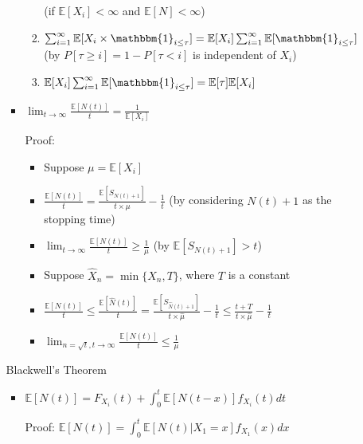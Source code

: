\documentclass[a4paper]{article}
\begin{document}
\begin{itemize}
\begin{itemize}
\begin{itemize}
\begin{enumerate}
                               (if $\mathbb{E}[X_i] < \infty$ and $\mathbb{E}[N] < \infty$)
                            \item $\sum_{i=1}^\infty \mathbb{E}[X_i \times \mathbbm{1}_{i\leq \tau}] = \mathbb{E}[X_i] \sum_{i=1}^\infty \mathbb{E}[\mathbbm{1}_{i\leq \tau}]$ (by $P[\tau \geq i] = 1 - P[\tau < i]$ is independent of $X_i$)
                            \item $\mathbb{E}[X_i] \sum_{i=1}^\infty \mathbb{E}[\mathbbm{1}_{i\leq \tau}] = \mathbb{E}[\tau] \mathbb{E}[X_i]$
                        \end{enumerate}
                    \item $\lim_{t \rightarrow \infty} \frac{\mathbb{E}[N(t)]}{t} = \frac{1}{\mathbb{E}[X_i]}$

                        Proof:
                        \begin{itemize}
                            \item Suppose $\mu = \mathbb{E}[X_i]$
                            \item $\frac{\mathbb{E}[N(t)]}{t} = \frac{\mathbb{E}[S_{N(t) + 1}]}{t \times \mu} - \frac{1}{t}$ (by considering $N(t) + 1$ as the stopping time)
                            \item $\lim_{t \rightarrow \infty} \frac{\mathbb{E}[N(t)]}{t} \geq \frac{1}{\mu}$ (by $\mathbb{E}[S_{N(t) + 1}] > t$)
                            \item Suppose $\hat{X}_n = \min\{X_n, T\}$, where $T$ is a constant
                            \item $\frac{\mathbb{E}[N(t)]}{t} \leq \frac{\mathbb{E}[\hat{N}(t)]}{t} = \frac{\mathbb{E}[S_{\hat{N}(t) + 1}]}{t \times \hat{\mu}} - \frac{1}{t} \leq \frac{t+T}{t \times \hat{\mu}} - \frac{1}{t}$
                            \item $\lim_{n = \sqrt{t}, t \rightarrow \infty} \frac{\mathbb{E}[N(t)]}{t} \leq \frac{1}{\mu}$
                        \end{itemize}
                \end{itemize}
                Blackwell's Theorem
                \begin{itemize}
                    \item $\mathbb{E}[N(t)] = F_{X_i}(t) + \int_0^t \mathbb{E}[N(t-x)] f_{X_i}(t) dt$

                        Proof:
                        $\mathbb{E}[N(t)] = \int_0^t \mathbb{E}[N(t)|X_1 = x] f_{X_1}(x) dx$


\end{itemize}
\end{itemize}
\end{itemize}
\end{document}
